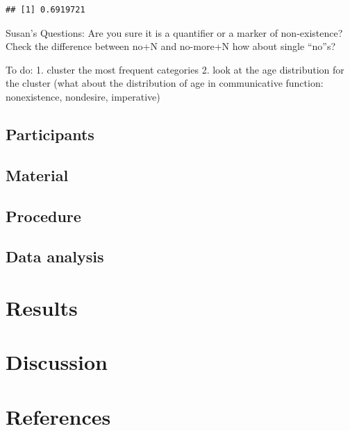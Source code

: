 \documentclass[man]{apa6}
\begin{document}
\begin{verbatim}
## [1] 0.6919721
\end{verbatim}

Susan's Questions: Are you sure it is a quantifier or a marker of
non-existence? Check the difference between no+N and no-more+N how about
single \enquote{no}s?

To do: 1. cluster the most frequent categories 2. look at the age
distribution for the cluster (what about the distribution of age in
communicative function: nonexistence, nondesire, imperative)

\subsection{Participants}\label{participants}

\subsection{Material}\label{material}

\subsection{Procedure}\label{procedure}

\subsection{Data analysis}\label{data-analysis}

\section{Results}\label{results}

\section{Discussion}\label{discussion}

\newpage

\section{References}\label{references}

\begingroup
\setlength{\parindent}{-0.5in} \setlength{\leftskip}{0.5in}

\hypertarget{refs}{}

\endgroup
\end{document}
